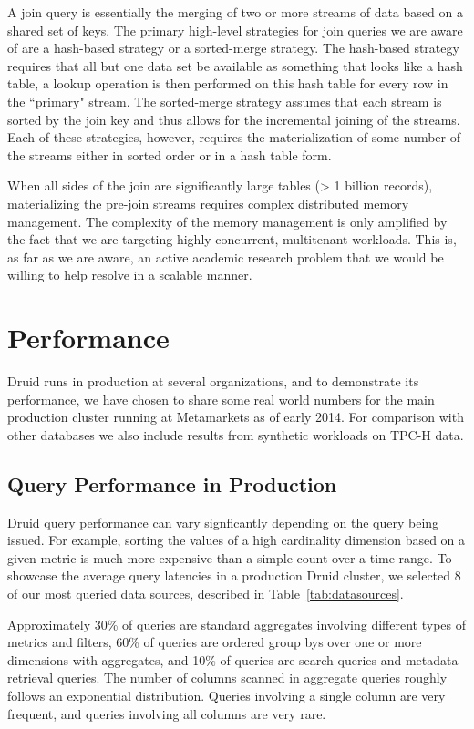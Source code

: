 \documentclass{sig-alternate-2013}
\begin{document}
A join query is essentially the merging of two or more streams of data based on
a shared set of keys. The primary high-level strategies for join queries we
are aware of are a hash-based strategy or a sorted-merge strategy. The
hash-based strategy requires that all but one data set be available as
something that looks like a hash table, a lookup operation is then performed on
this hash table for every row in the ``primary" stream. The sorted-merge
strategy assumes that each stream is sorted by the join key and thus allows for
the incremental joining of the streams. Each of these strategies, however,
requires the materialization of some number of the streams either in sorted
order or in a hash table form.

When all sides of the join are significantly large tables (> 1 billion records),
materializing the pre-join streams requires complex distributed memory
management. The complexity of the memory management is only amplified by
the fact that we are targeting highly concurrent, multitenant workloads.
This is, as far as we are aware, an active academic research
problem that we would be willing to help resolve in a scalable manner.


\section{Performance}
\label{sec:benchmarks}
Druid runs in production at several organizations, and to demonstrate its
performance, we have chosen to share some real world numbers for the main production
cluster running at Metamarkets as of early 2014. For comparison with other databases
we also include results from synthetic workloads on TPC-H data.

\subsection{Query Performance in Production}
Druid query performance can vary signficantly depending on the query
being issued. For example, sorting the values of a high cardinality dimension
based on a given metric is much more expensive than a simple count over a time
range. To showcase the average query latencies in a production Druid cluster,
we selected 8 of our most queried data sources, described in Table~\ref{tab:datasources}.

Approximately 30\% of queries are standard
aggregates involving different types of metrics and filters, 60\% of queries
are ordered group bys over one or more dimensions with aggregates, and 10\% of
queries are search queries and metadata retrieval queries. The number of
columns scanned in aggregate queries roughly follows an exponential
distribution. Queries involving a single column are very frequent, and queries
involving all columns are very rare.
\end{document}
